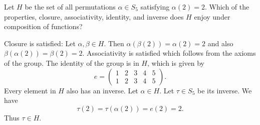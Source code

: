 \begin{problem}
	Let $ H $ be the set of all permutations $ \alpha \in S_5 $ satisfying $ \alpha(2) =2 $. Which of the properties, closure, associativity, identity, and inverse does $ H $ enjoy under composition of functions?
\end{problem}
\begin{solution}
	Closure is satisfied: Let $ \alpha,\beta \in H $. Then $ \alpha(\beta(2)) = \alpha(2) = 2 $ and also $ \beta(\alpha(2)) = \beta(2) = 2 $. Associativity is satisfied which follows from the axioms of the group. The identity of the group is in $ H $, which is given by
	\[ e = \begin{pmatrix} 1 & 2 & 3 & 4 & 5 \\ 1 & 2 & 3 & 4 & 5\end{pmatrix}. \] 
	Every element in $ H $ also has an inverse. Let $ \alpha \in H $. Let $ \tau \in S_5 $ be its inverse. We have
	\[ \tau(2) = \tau(\alpha(2)) = e(2) = 2. \]
	Thus $ \tau \in H $.
\end{solution}